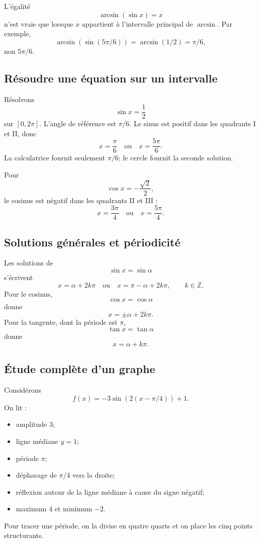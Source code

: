 \documentclass[12pt,a4paper,openany]{book}
\newcommand{\Z}{\mathbb{Z}}
\begin{document}
\begin{warningbox}
L'égalité
\[
\arcsin(\sin x)=x
\]
n'est vraie que lorsque $x$ appartient à l'intervalle principal de $\arcsin$. Par exemple,
\[
\arcsin(\sin(5\pi/6))=\arcsin(1/2)=\pi/6,
\]
non $5\pi/6$.
\end{warningbox}

\subsection{Résoudre une équation sur un intervalle}

Résolvons
\[
\sin x=\frac12
\]
sur $[0,2\pi]$. L'angle de référence est $\pi/6$. Le sinus est positif dans les quadrants I et II, donc
\[
x=\frac\pi6
\quad\text{ou}\quad
x=\frac{5\pi}{6}.
\]
La calculatrice fournit seulement $\pi/6$; le cercle fournit la seconde solution.

Pour
\[
\cos x=-\frac{\sqrt2}{2},
\]
le cosinus est négatif dans les quadrants II et III :
\[
x=\frac{3\pi}{4}
\quad\text{ou}\quad
x=\frac{5\pi}{4}.
\]

\subsection{Solutions générales et périodicité}

Les solutions de
\[
\sin x=\sin\alpha
\]
s'écrivent
\[
x=\alpha+2k\pi
\quad\text{ou}\quad
x=\pi-\alpha+2k\pi,
\qquad k\in\Z.
\]
Pour le cosinus,
\[
\cos x=\cos\alpha
\]
donne
\[
x=\pm\alpha+2k\pi.
\]
Pour la tangente, dont la période est $\pi$,
\[
\tan x=\tan\alpha
\]
donne
\[
x=\alpha+k\pi.
\]

\subsection{Étude complète d'un graphe}

Considérons
\[
f(x)=-3\sin(2(x-\pi/4))+1.
\]
On lit :
\begin{itemize}
\item amplitude $3$;
\item ligne médiane $y=1$;
\item période $\pi$;
\item déphasage de $\pi/4$ vers la droite;
\item réflexion autour de la ligne médiane à cause du signe négatif;
\item maximum $4$ et minimum $-2$.
\end{itemize}
Pour tracer une période, on la divise en quatre quarts et on place les cinq points structurants.
\end{document}
